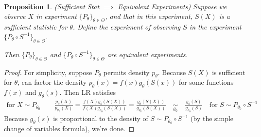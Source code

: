 \documentclass[12pt]{article}
\theoremstyle{plain}
\newtheorem{prop}[thm]{Proposition}
\theoremstyle{definition}
\theoremstyle{remark}
\begin{document}
\begin{prop}
\emph{(Sufficient Stat $\implies$ Equivalent Experiments)}
Suppose we observe $X$ in experiment $\{P_\theta\}_{\theta\in\Theta}$,
and that in this experiment, $S(X)$ is a sufficient statistic for
$\theta$.
Define the experiment of observing $S$ in the experiment
$\{P_\theta\circ S^{-1}\}_{\theta\in\Theta}$.

Then $\{P_\theta\}_{\theta\in\Theta}$ and
$\{P_\theta\circ S^{-1}\}_{\theta\in\Theta}$ are equivalent experiments.
\end{prop}
\begin{proof}
For simplicity, suppose $P_\theta$ permits density $p_\theta$.
Because $S(X)$ is sufficient for $\theta$, can factor the density
$p_\theta(x)=f(x)g_\theta(S(x))$ for some functions $f(x)$ and
$g_\theta(s)$.
Then LR satisfies
\begin{align*}
  \text{for $X\sim P_{\theta_0}$}\qquad
  \frac{p_\theta(X)}{p_{\theta_0}(X)}
  = \frac{f(X)g_\theta(S(X))}{f(X)g_{\theta_0}(S(X))}
  = \frac{g_\theta(S(X))}{g_{\theta_0}(S(X))}
  \quad
  \underset{\theta_0}{\sim}
  \quad
  \frac{g_\theta(S)}{g_{\theta_0}(S)}
  \quad
  \text{for $S\sim P_{\theta_0}\circ S^{-1}$}\qquad
\end{align*}
Because $g_\theta(s)$ is proportional to the density of
$S\sim P_{\theta_0}\circ S^{-1}$ (by the simple change of variables
formula), we're done.
\end{proof}
\end{document}
